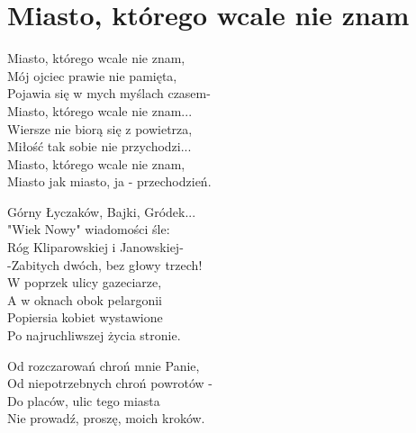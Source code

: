 \section{Miasto, którego wcale nie znam}
\begin{text}
\vin Miasto, którego wcale nie znam,\\
\vin Mój ojciec prawie nie pamięta,\\
\vin Pojawia się w mych myślach czasem-\\
\vin Miasto, którego wcale nie znam...\\
\vin Wiersze nie biorą się z powietrza,\\
\vin Miłość tak sobie nie przychodzi...\\
\vin Miasto, którego wcale nie znam,\\
\vin Miasto jak miasto, ja - przechodzień.

Górny Łyczaków, Bajki, Gródek...\\
"Wiek Nowy" wiadomości śle:\\
Róg Kliparowskiej i Janowskiej-\\
-Zabitych dwóch, bez głowy trzech!\\
W poprzek ulicy gazeciarze,\\
A w oknach obok pelargonii\\
Popiersia kobiet wystawione\\
Po najruchliwszej życia stronie.

Od rozczarowań chroń mnie Panie,\\
Od niepotrzebnych chroń powrotów -\\
Do placów, ulic tego miasta\\
Nie prowadź, proszę, moich kroków. 
\end{text}